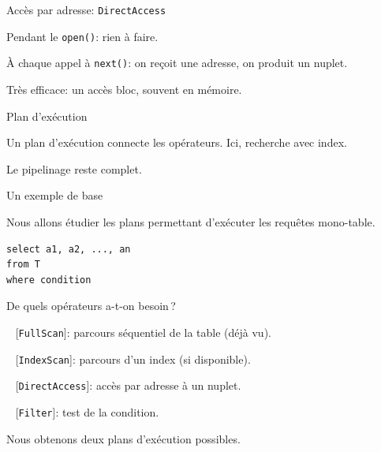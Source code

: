 \begin{frame}[fragile]{Accès par adresse: \texttt{DirectAccess}}

\begin{redbullet}
  \item Pendant le \texttt{open()}: rien à faire. 
  \item À chaque appel à \texttt{next()}: on reçoit une adresse, on produit un nuplet. 
\end{redbullet}  

\vfill


\vfill

Très efficace: un accès bloc, souvent en mémoire.
\end{frame}

\begin{frame}{Plan d'exécution}

Un plan d'exécution connecte les opérateurs. Ici, recherche avec index.

\vfill


\vfill

Le pipelinage reste complet.

\end{frame}



\begin{frame}[fragile]{Un exemple de base}

Nous allons étudier les plans permettant d'exécuter les
requêtes \alert{mono-table}.

\begin{verbatim}
select a1, a2, ..., an 
from T 
where condition
\end{verbatim}

\vfill

De quels opérateurs a-t-on besoin\,?

\begin{redbullet}
 \item ~ [\texttt{FullScan}]: parcours séquentiel de la table (déjà vu).
 \item ~ [\texttt{IndexScan}]: parcours d'un index (si disponible).
 \item ~ [\texttt{DirectAccess}]: accès \alert{par adresse} à un nuplet.
 \item ~ [\texttt{Filter}]: test de la condition.
\end{redbullet}

\vfill

Nous obtenons \alert{deux} plans d'exécution possibles.
\end{frame}

